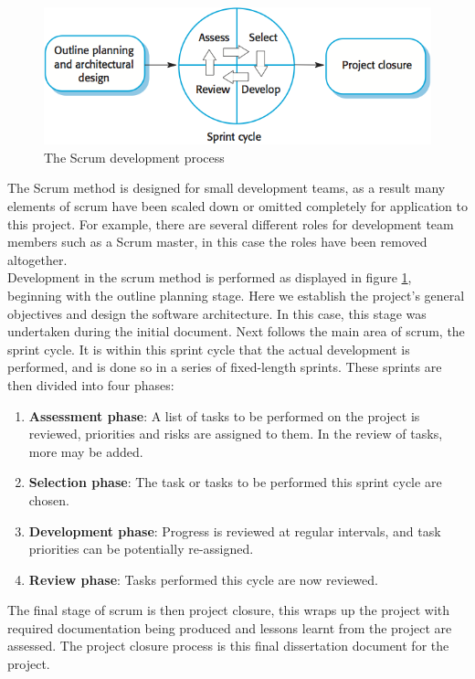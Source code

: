 \documentclass[10pt]{article}
\begin{document}
		\begin{figure}[h]			
			\includegraphics[scale=1]{img/scrum}
			\centering
			\caption{The Scrum development process \cite{swengi}}
			\label{scrum}
		\end{figure}
		
		The Scrum method is designed for small development teams, as a result many elements of scrum have been scaled down or omitted completely for application to this project. For example, there are several different roles for development team members such as a Scrum master, in this case the roles have been removed altogether.\\
		
		Development in the scrum method is performed as displayed in figure \ref{scrum}, beginning with the outline planning stage. Here we establish the project's general objectives and design the software architecture. In this case, this stage was undertaken during the initial document. Next follows the main area of scrum, the sprint cycle. It is within this sprint cycle that the actual development is performed, and is done so in a series of fixed-length sprints. These sprints are then divided into four phases:
		
		\begin{enumerate}
			\item \textbf{Assessment phase}: A list of tasks to be performed on the project is reviewed, priorities and risks are assigned to them. In the review of tasks, more may be added.
			\item \textbf{Selection phase}: The task or tasks to be performed this sprint cycle are chosen.
			\item \textbf{Development phase}: Progress is reviewed at regular intervals, and task priorities can be potentially re-assigned.
			\item \textbf{Review phase}: Tasks performed this cycle are now reviewed.\\
		\end{enumerate}
		
		The final stage of scrum is then project closure, this wraps up the project with required documentation being produced and lessons learnt from the project are assessed. The project closure process is this final dissertation document for the project.\\
		
\end{document}
